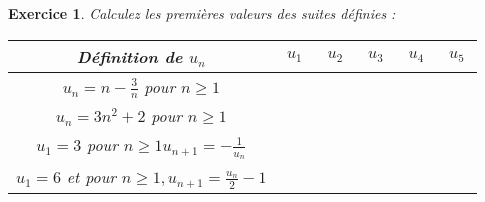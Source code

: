 \documentclass[11pt,a4paper]{exam}
\newtheorem{exo}{Exercice}
\begin{document}
\vspace{0.5cm}
\begin{exo}Calculez les premières valeurs des suites définies :

\renewcommand{\arraystretch}{2}
\begin{center}
    \begin{tabular}{|c|c|c|c|c|c|}
        \hline
          Définition de $u_n$&$\;u_1\;$&$\;u_2\;$&$\;u_3\;$&$\;u_4\;$&$\;u_5\;$\\
          \hline
         $u_n=n-\frac{3}{n}$ pour $n \geq 1$& & & & &\\
          \hline
         $u_n=3n^2+2$ pour $n \geq 1$& & & & &\\
          \hline
         $u_1=3$ pour $n \geq 1 u_{n+1} = -\frac{1}{u_n}$& & & & &\\
          \hline
         $u_1=6$ et pour $n \geq 1, u_{n+1}=\frac{u_n}{2} - 1$& & & & &\\
          \hline
    \end{tabular}
\end{center}
\end{exo} 
\vspace{0.5cm}
\end{document}
